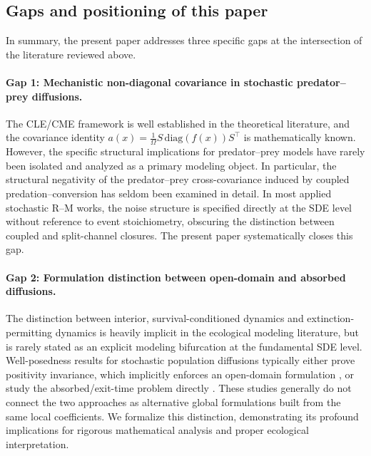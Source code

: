 \documentclass[pdflatex,sn-mathphys-ay]{sn-jnl}
\theoremstyle{thmstyleone}
\theoremstyle{definition}
\theoremstyle{remark}
\begin{document}
\subsection{Gaps and positioning of this paper}

In summary, the present paper addresses three specific gaps at the intersection of the literature reviewed above.

\paragraph{Gap 1: Mechanistic non-diagonal covariance in stochastic predator--prey diffusions.}
The CLE/CME framework is well established in the theoretical literature, and the covariance identity $a(x) = \frac{1}{\Omega}S\,\mathrm{diag}(f(x))S^\top$ is mathematically known. However, the specific structural implications for predator--prey models have rarely been isolated and analyzed as a primary modeling object.
In particular, the structural negativity of the predator--prey cross-covariance induced by coupled predation--conversion has seldom been examined in detail.
In most applied stochastic R--M works, the noise structure is specified directly at the SDE level without reference to event stoichiometry, obscuring the distinction between coupled and split-channel closures. The present paper systematically closes this gap.

\paragraph{Gap 2: Formulation distinction between open-domain and absorbed diffusions.}
The distinction between interior, survival-conditioned dynamics and extinction-permitting dynamics is heavily implicit in the ecological modeling literature, but is rarely stated as an explicit modeling bifurcation at the fundamental SDE level. 
Well-posedness results for stochastic population diffusions typically either prove positivity invariance, which implicitly enforces an open-domain formulation \citep{cui_long-term_2026,zhao_stochastic_2024,zhan_dynamical_2024,liu_asymptotic_2020},
or study the absorbed/exit-time problem directly \citep{nasell_extinction_2001,cattiaux_quasi-stationary_2009}.
These studies generally do not connect the two approaches as alternative global formulations built from the same local coefficients. 
We formalize this distinction, demonstrating its profound implications for rigorous mathematical analysis and proper ecological interpretation.
\end{document}
